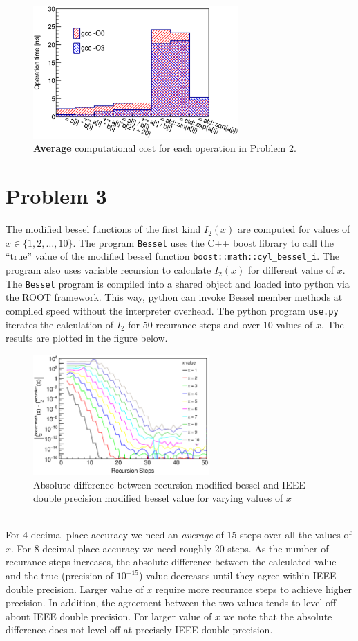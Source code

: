\documentclass[singlepage,notitlepage,nofootinbib,11pt]{revtex4-1}
\begin{document}
\begin{figure}
\centering
\includegraphics[width=0.7\textwidth]{figures/2_last.eps}
\caption{{\bf Average} computational cost for each operation in Problem 2.}
\end{figure}
\clearpage
\section{Problem 3}
The modified bessel functions of the first kind $I_2(x)$ are computed for values of $x\in\{1,2,\dots,10\}$. The program \verb|Bessel| uses the C++ boost library to call the ``true'' value of the modified bessel function \verb|boost::math::cyl_bessel_i|. The program also uses variable recursion to calculate $I_2(x)$ for different value of $x$. The \verb|Bessel| program is compiled into a shared object and loaded into python via the ROOT framework. This way, python can invoke Bessel member methods at compiled speed without the interpreter overhead. The python program \verb|use.py| iterates the calculation of $I_2$ for 50 recurance steps and over 10 values of $x$. The results are plotted in the figure below. 
\begin{figure}[h]
\centering
\includegraphics[width=0.6\textwidth]{figures/modified_bessel.eps}
\caption{Absolute difference between recursion modified bessel and IEEE double precision modified bessel value for varying values of $x$}
\end{figure}\\
\indent For 4-decimal place accuracy we need an {\it average} of 15 steps over all the values of $x$. For 8-decimal place accuracy we need roughly 20 steps. As the number of recurance steps increases, the absolute difference between the calculated value and the true (precision of $10^{-15}$) value decreases until they agree within IEEE double precision. Larger value of $x$ require more recurance steps to achieve higher precision. In addition, the agreement between the two values tends to level off about IEEE double precision. For larger value of $x$ we note that the absolute difference does not level off at precisely IEEE double precision. 
\end{document}
